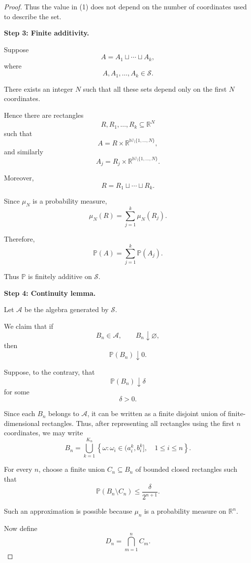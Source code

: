 \begin{proof}
Thus the value in (1) does not depend on the number of coordinates
used to describe the set.

\medskip
\noindent
\textbf{Step 3: Finite additivity.}

Suppose
\[
A=A_1\sqcup\cdots\sqcup A_k,
\]
where
\[
A,A_1,\ldots,A_k\in\mathcal{S}.
\]

There exists an integer $N$ such that all these sets depend only on
the first $N$ coordinates.

Hence there are rectangles
\[
R,R_1,\ldots,R_k\subseteq\mathbb{R}^N
\]
such that
\[
A
=
R\times
\mathbb{R}^{\mathbb{N}\setminus\{1,\ldots,N\}},
\]
and similarly
\[
A_j
=
R_j\times
\mathbb{R}^{\mathbb{N}\setminus\{1,\ldots,N\}}.
\]

Moreover,
\[
R=R_1\sqcup\cdots\sqcup R_k.
\]

Since $\mu_N$ is a probability measure,
\[
\mu_N(R)
=
\sum_{j=1}^k\mu_N(R_j).
\]

Therefore,
\[
\mathbb{P}(A)
=
\sum_{j=1}^k\mathbb{P}(A_j).
\]

Thus $\mathbb{P}$ is finitely additive on $\mathcal{S}$.

\medskip
\noindent
\textbf{Step 4: Continuity lemma.}

Let $\mathcal{A}$ be the algebra generated by $\mathcal{S}$.

We claim that if
\[
B_n\in\mathcal{A},
\qquad
B_n\downarrow\varnothing,
\]
then
\[
\boxed{
\mathbb{P}(B_n)\downarrow0.
}
\tag{2}
\]

Suppose, to the contrary, that
\[
\mathbb{P}(B_n)\downarrow\delta
\]
for some
\[
\delta>0.
\]

Since each $B_n$ belongs to $\mathcal{A}$, it can be written as a
finite disjoint union of finite-dimensional rectangles. Thus, after
representing all rectangles using the first $n$ coordinates, we may
write
\[
B_n
=
\bigcup_{k=1}^{K_n}
\left\{
\omega:
\omega_i\in(a_i^k,b_i^k],
\quad
1\leq i\leq n
\right\}.
\tag{3}
\]

For every $n$, choose a finite union $C_n\subseteq B_n$ of bounded
closed rectangles such that
\[
\boxed{
\mathbb{P}(B_n\setminus C_n)
\leq
\frac{\delta}{2^{n+1}}.
}
\tag{4}
\]

Such an approximation is possible because $\mu_n$ is a probability
measure on $\mathbb{R}^n$.

Now define
\[
D_n=\bigcap_{m=1}^nC_m.
\]


\end{proof}
